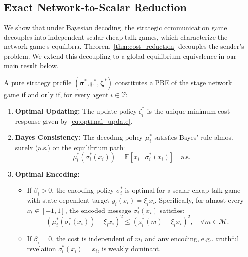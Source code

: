 \documentclass[journal,twoside,web]{ieeecolor}
\begin{document}
\subsection{Exact Network-to-Scalar Reduction}
\label{subsec:exact_network_reduction}
We show that under Bayesian decoding, the strategic communication game decouples into independent scalar cheap talk games, which characterize the network game's equilibria. Theorem~\ref{thm:cost_reduction} decouples the sender's problem. We extend this decoupling to a global equilibrium equivalence in our main result below.

\begin{theorem}
    \label{thm:exact_reduction}
    A pure strategy profile $(\bm{\sigma}^*, \bm{\mu}^*,\bm{\zeta}^*)$ constitutes a PBE of the stage network game if and only if, for every agent $i\in\mathcal{V}$:
    \begin{enumerate}[wide]
        \item \textbf{Optimal Updating:} The update policy $\zeta_i^*$ is the unique minimum-cost response given by \eqref{eq:optimal_update}.\label{thm:exact_reduction:c1}
        \item \textbf{Bayes Consistency:} The decoding policy $\mu_i^*$ satisfies Bayes' rule almost surely (a.s.) on the equilibrium path:\label{thm:exact_reduction:c2}
              \[
                  \mu_i^*(\sigma_i^*(x_i)) = \mathbb{E}[x_i \mid \sigma_i^*(x_i)] \quad \text{a.s.}
              \]
        \item \textbf{Optimal Encoding:}\label{thm:exact_reduction:c3}
              \begin{itemize}
                  \item If $\beta_i > 0$, the encoding policy $\sigma_i^*$ is optimal for a scalar cheap talk game with state-dependent target $y_i(x_i) = \xi_i x_i$.
                        Specifically, for almost every $x_i \in [-1, 1]$, the encoded message $\sigma_i^*(x_i)$ satisfies:
                        $$ \left(\mu_i^*(\sigma_i^*(x_i)) - \xi_i x_i\right)^2 \le \left(\mu_i^*(m) - \xi_i x_i\right)^2, \quad \forall m \in \mathcal{M}. $$
                  \item If $\beta_i = 0$, the cost is independent of $m_i$ and any encoding, e.g., truthful revelation $\sigma_i^*(x_i) = x_i$, is weakly dominant.
              \end{itemize}
    \end{enumerate}
\end{theorem}
\end{document}
